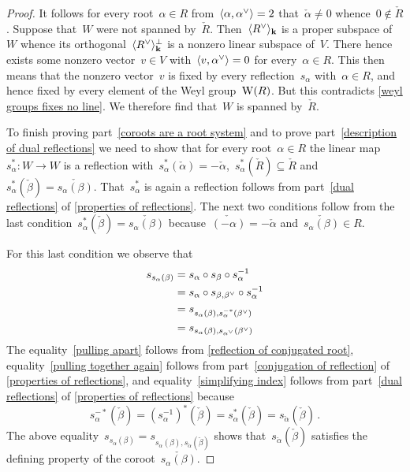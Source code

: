 \begin{proof}
  It follows for every root~$\alpha \in R$ from~$\pair{\alpha, \check{\alpha}} = 2$ that~$\check{\alpha} \neq 0$ whence~$0 \notin \check{R}$.
  Suppose that~$W$ were not spanned by~$\check{R}$.
  Then~$\gen{\check{R}}_{\kf}$ is a proper subspace of~$W$ whence its orthogonal~$\gen{\check{R}}_{\kf}^\perp$ is a nonzero linear subspace of~$V$.
  There hence exists some nonzero vector~$v \in V$ with~$\pair{v, \check{\alpha}} = 0$ for every~$\alpha \in R$.
  This then means that the nonzero vector~$v$ is fixed by every reflection~$s_\alpha$ with~$\alpha \in R$, and hence fixed by every element of the Weyl group~$\operatorname{W}(R)$.
  But this contradicts \cref{weyl groups fixes no line}.
  We therefore find that~$W$ is spanned by~$\check{R}$.
  
  To finish proving part~\ref*{coroots are a root system} and to prove part~\ref*{description of dual reflections} we need to show that for every root~$\alpha \in R$ the linear map~$s_\alpha^* \colon W \to W$ is a reflection with~$s_\alpha^*(\check{\alpha}) = -\check{\alpha}$,~$s_\alpha^*(\check{R}) \subseteq \check{R}$ and~$s_\alpha^*(\check{\beta}) = \check{s_\alpha(\beta)}$.
  That~$s_\alpha^*$ is again a reflection follows from part~\ref*{dual reflections} of \cref{properties of reflections}.
  The next two conditions follow from the last condition~$s_\alpha^*(\check{\beta}) = \check{s_\alpha(\beta)}$ because~$\check{(-\alpha)} = -\check{\alpha}$ and~$\check{s_\alpha(\beta)} \in R$.
  
  For this last condition we observe that
  \begin{align}
    s_{s_\alpha(\beta)}
    &=
    s_\alpha \circ s_\beta \circ s_\alpha^{-1}
    \label{pulling apart}
    \\
    &=
    s_\alpha \circ s_{\beta, \check{\beta}} \circ s_\alpha^{-1}
    \notag
    \\
    &=
    s_{s_\alpha(\beta), s_\alpha^{-*}(\check{\beta})}
    \label{pulling together again}
    \\
    &=
    s_{s_\alpha(\beta), s_{\check{\alpha}}(\check{\beta})}
    \label{simplifying index}
  \end{align}
  The equality~\eqref{pulling apart} follows from \cref{reflection of conjugated root}, equality~\eqref{pulling together again} follows from part~\ref*{conjugation of reflection} of \cref{properties of reflections}, and equality~\eqref{simplifying index} follows from part~\ref*{dual reflections} of \cref{properties of reflections} because
  \[
    s_\alpha^{-*}(\check{\beta})
    =
    (s_\alpha^{-1})^*(\check{\beta})
    =
    s_\alpha^*(\check{\beta})
    =
    s_{\check{\alpha}}(\check{\beta}) \,.
  \]
  The above equality~$s_{s_\alpha(\beta)} = s_{s_\alpha(\beta), s_{\check{\alpha}}(\check{\beta})}$ shows that~$s_{\check{\alpha}}(\check{\beta})$ satisfies the defining property of the coroot~$\check{s_\alpha(\beta)}$.
  

\end{proof}
